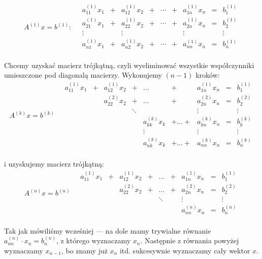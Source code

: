 \documentclass[10pt]{article}
\begin{document}
$$
A^{(1)} x = b^{(1)}:
\quad
\begin{matrix}
    a^{(1)}_{11} x_1 &+ &a^{(1)}_{12} x_2 &+ &\dotsb &+ &a^{(1)}_{1n} x_n &= &b^{(1)}_1\\
    a^{(1)}_{21} x_1 &+ &a^{(1)}_{22} x_2 &+ &\dotsb &+ &a^{(1)}_{2n} x_n &= &b^{(1)}_2\\
    \vdots && \vdots &&&& \vdots && \vdots\\
    a^{(1)}_{n1} x_1 &+ &a^{(1)}_{n2} x_2 &+ &\dotsb &+ &a^{(1)}_{nn} x_n &= &b^{(1)}_n\\
\end{matrix}
$$

Chcemy uzyskać macierz trójkątną, czyli wyeliminować wszystkie współczynniki umieszczone pod diagonalą macierzy. Wykonujemy $(n-1)$ kroków:
$$
A^{(k)} x = b^{(k)}
\quad
\begin{matrix}
    a_{11}^{(1)} x_1 &+ & a_{12}^{(1)} x_2 &+ &\dots &+ &a_{1n}^{(1)} x_n &= &b_1^{(1)}\\
    && a_{22}^{(2)} x_2 &+ &\dots &+ &a_{2n}^{(2)} x_n &= &b_2^{(2)}\\
    &&& \ddots &&& \vdots && \vdots\\
    &&&&a_{kk}^{(k)} x_k &+ \dots + &a_{kn}^{(k)} x_n &= &b_k^{(k)}\\
    &&&&\vdots && \vdots && \vdots\\
    &&&& a_{nk}^{(k)} x_k &+ \dots + &a_{nn}^{(k)} x_n &= &b_n^{(k)}\\
\end{matrix}
$$

i uzyskujemy macierz trójkątną:
$$
A^{(n)} x = b^{(n)}
\quad
\begin{matrix}
    a_{11}^{(1)} x_1 &+ & a_{12}^{(1)} x_2 &+ &\dots &+ &a_{1n}^{(1)} x_n &= &b_1^{(1)}\\
    && a_{22}^{(2)} x_2 &+ &\dots &+ &a_{2n}^{(2)} x_n &= &b_2^{(2)}\\
    &&&& \ddots && \vdots && \vdots\\
    &&&&&&a_{nn}^{(n)} x_n &= &b_n^{(n)}\\
\end{matrix}
$$

Tak jak mówiliśmy wcześniej — na dole mamy trywialne równanie $a_{nn}^{(n)} \cdot x_n = b_n^{(n)}$, z którego wyznaczamy $x_n$. Następnie z równania powyżej wyznaczamy $x_{n-1}$, bo znamy już $x_n$ itd. sukcesywnie wyznaczamy cały wektor $x$.

\newpage
\end{document}
